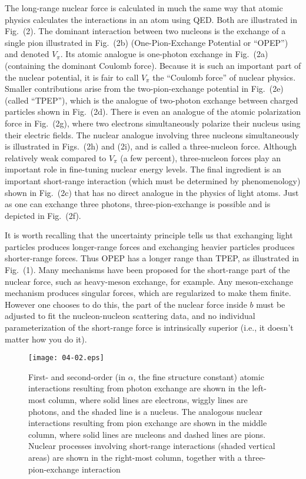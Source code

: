 \documentclass{svmult}
\begin{document}
The long-range nuclear force is calculated in much the same way that atomic
physics calculates the interactions in an atom using QED.  Both are illustrated
in Fig.~(2). The dominant interaction between two nucleons is the exchange of a
single pion illustrated in Fig.~(2b) (One-Pion-Exchange Potential or
``OPEP'') and denoted $V_{\pi}$. Its atomic analogue
is one-photon exchange in Fig.~(2a) (containing the dominant Coulomb force).
Because it is such an important part of the nuclear potential, it is fair to
call $V_{\pi}$ the ``Coulomb force'' of nuclear physics.  Smaller contributions
arise from the two-pion-exchange potential in Fig.~(2e) (called
``TPEP''), which is the analogue of two-photon
exchange between charged particles shown in Fig.~(2d). There is even an analogue
of the atomic polarization force in Fig.~(2g), where two electrons 
simultaneously polarize their nucleus using their electric fields. The nuclear
analogue involving three nucleons simultaneously is illustrated in Figs.~(2h)
and (2i), and is called a three-nucleon
force\cite{3NF}. Although relatively
weak compared to $V_{\pi}$ (a few percent), three-nucleon forces play an
important role in fine-tuning nuclear energy levels. The final ingredient is an
important short-range interaction (which
must be determined by phenomenology) shown in Fig.~(2c) that has no direct
analogue in the physics of light atoms. Just as one can exchange three photons,
three-pion-exchange is possible and is depicted in Fig.~(2f).

It is worth recalling that the uncertainty principle tells us that exchanging
light particles produces longer-range forces and exchanging heavier particles
produces shorter-range forces. Thus OPEP has a longer range than TPEP, as
illustrated in Fig.~(1). Many mechanisms have been proposed for the short-range
part of the nuclear force, such as heavy-meson exchange, for example. Any
meson-exchange mechanism produces singular forces, which are regularized to make
them finite. However one chooses to do this, the part of the nuclear force
inside $b$ must be adjusted to fit the nucleon-nucleon scattering
data, and no individual parameterization of the
short-range force is intrinsically superior (i.e., it doesn't matter how you do
it).

\begin{figure} \centering 
\texttt{[image: 04-02.eps]}  
\caption{First- and second-order (in $\alpha$, the fine structure constant)  
atomic interactions resulting from photon exchange are shown in the left-most  
column, where solid lines are electrons, wiggly lines are photons, and the  
shaded line is a nucleus. The analogous nuclear interactions resulting from  
pion exchange are shown in the middle column, where solid lines are nucleons  
and dashed lines are pions. Nuclear processes involving short-range interactions
(shaded vertical areas) are shown in the right-most column, together with a
three-pion-exchange interaction}
\end{figure}
\end{document}

